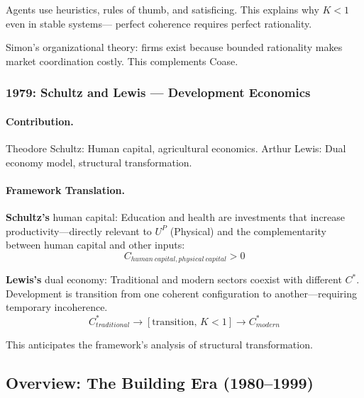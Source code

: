 Agents use heuristics, rules of thumb, and satisficing.
This explains why $K < 1$ even in stable systems---
perfect coherence requires perfect rationality.

Simon's organizational theory: firms exist because bounded rationality
makes market coordination costly. This complements Coase.

\subsubsection{1979: Schultz and Lewis --- Development Economics}

\paragraph{Contribution.}
Theodore Schultz: Human capital, agricultural economics.
Arthur Lewis: Dual economy model, structural transformation.

\paragraph{Framework Translation.}
\textbf{Schultz's} human capital: Education and health are investments
that increase productivity---directly relevant to $U^P$ (Physical) and
the complementarity between human capital and other inputs:
\begin{equation}
  C_{human\ capital, physical\ capital} > 0
\end{equation}

\textbf{Lewis's} dual economy: Traditional and modern sectors coexist
with different $C^*$. Development is transition from one coherent
configuration to another---requiring temporary incoherence.
\begin{equation}
  C^*_{traditional} \to [\text{transition, } K < 1] \to C^*_{modern}
\end{equation}

This anticipates the framework's analysis of structural transformation.

\subsection{Overview: The Building Era (1980--1999)}

